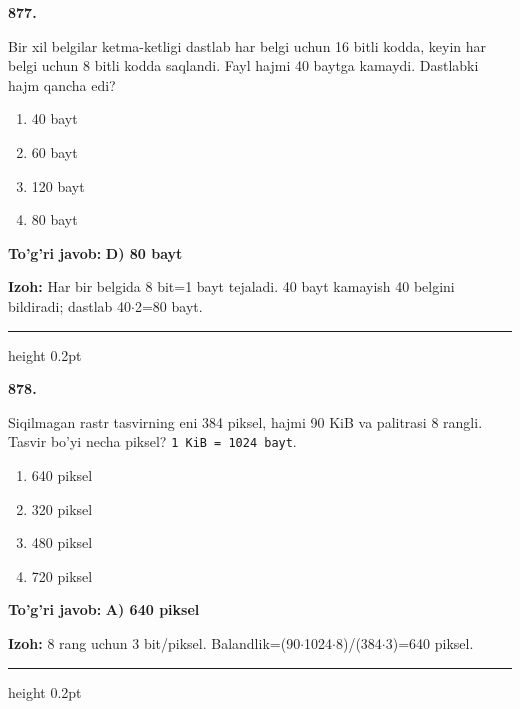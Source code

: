 \documentclass[10pt,a4paper,oneside]{article}
\begin{document}
\noindent\textbf{\color{ink}877.}
\par
Bir xil belgilar ketma-ketligi dastlab har belgi uchun 16 bitli kodda, keyin har belgi uchun 8 bitli kodda saqlandi. Fayl hajmi 40 baytga kamaydi. Dastlabki hajm qancha edi?
\begin{enumerate}[label=\Alph*),leftmargin=9mm]
\item 40 bayt
\item 60 bayt
\item 120 bayt
\item 80 bayt
\end{enumerate}
\begin{tcolorbox}[enhanced,breakable,colback=teal!4,colframe=teal!50!black,boxrule=0.5pt,arc=1.1mm,left=3mm,right=3mm,top=1.7mm,bottom=1.7mm,before skip=2mm,after skip=2mm]
\textbf{\color{teal}To'g'ri javob:} \textbf{D) 80 bayt}
\par\smallskip
\textbf{Izoh:} Har bir belgida 8 bit=1 bayt tejaladi. 40 bayt kamayish 40 belgini bildiradi; dastlab 40\ensuremath{\cdot}2=80 bayt.
\end{tcolorbox}
\vspace{2mm}\hrule height 0.2pt \vspace{3mm}

\noindent\textbf{\color{ink}878.}
\par
Siqilmagan rastr tasvirning eni 384 piksel, hajmi 90 KiB va palitrasi 8 rangli. Tasvir bo'yi necha piksel? \texttt{1 KiB = 1024 bayt}.
\begin{enumerate}[label=\Alph*),leftmargin=9mm]
\item 640 piksel
\item 320 piksel
\item 480 piksel
\item 720 piksel
\end{enumerate}
\begin{tcolorbox}[enhanced,breakable,colback=teal!4,colframe=teal!50!black,boxrule=0.5pt,arc=1.1mm,left=3mm,right=3mm,top=1.7mm,bottom=1.7mm,before skip=2mm,after skip=2mm]
\textbf{\color{teal}To'g'ri javob:} \textbf{A) 640 piksel}
\par\smallskip
\textbf{Izoh:} 8 rang uchun 3 bit/piksel. Balandlik=(90\ensuremath{\cdot}1024\ensuremath{\cdot}8)/(384\ensuremath{\cdot}3)=640 piksel.
\end{tcolorbox}
\vspace{2mm}\hrule height 0.2pt \vspace{3mm}
\end{document}
